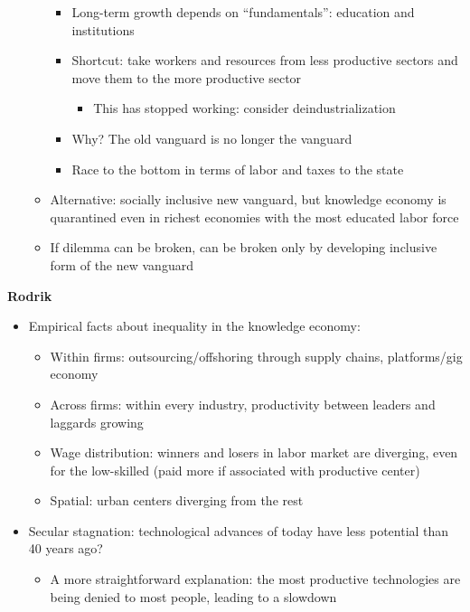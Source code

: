 \begin{itemize}
\begin{itemize}
    \begin{itemize}
    \tightlist
    \item
      Long-term growth depends on ``fundamentals'': education and
      institutions
    \item
      Shortcut: take workers and resources from less productive sectors
      and move them to the more productive sector

      \begin{itemize}
      \tightlist
      \item
        This has stopped working: consider deindustrialization
      \end{itemize}
    \item
      Why? The old vanguard is no longer the vanguard
    \item
      Race to the bottom in terms of labor and taxes to the state
    \end{itemize}
  \item
    Alternative: socially inclusive new vanguard, but knowledge economy
    is quarantined even in richest economies with the most educated
    labor force
  \item
    If dilemma can be broken, can be broken only by developing inclusive
    form of the new vanguard
  \end{itemize}
\end{itemize}

\textbf{Rodrik}

\begin{itemize}
\tightlist
\item
  Empirical facts about inequality in the knowledge economy:

  \begin{itemize}
  \tightlist
  \item
    Within firms: outsourcing/offshoring through supply chains,
    platforms/gig economy
  \item
    Across firms: within every industry, productivity between leaders
    and laggards growing
  \item
    Wage distribution: winners and losers in labor market are diverging,
    even for the low-skilled (paid more if associated with productive
    center)
  \item
    Spatial: urban centers diverging from the rest
  \end{itemize}
\item
  Secular stagnation: technological advances of today have less
  potential than 40 years ago?

  \begin{itemize}
  \tightlist
  \item
    A more straightforward explanation: the most productive technologies
    are being denied to most people, leading to a slowdown
  \end{itemize}
\end{itemize}


